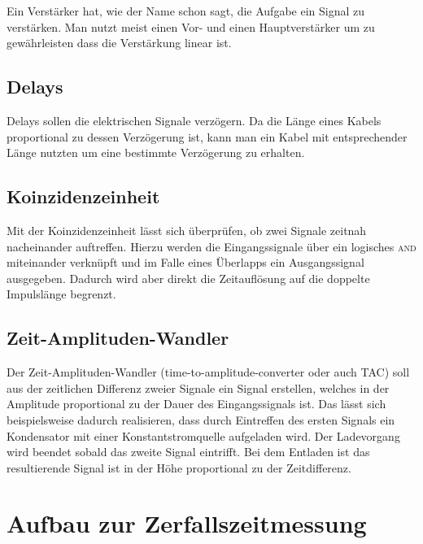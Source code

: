\documentclass[11pt, ngerman, fleqn, DIV=15, headinclude, BCOR=2cm]{scrreprt}
\begin{document}
Ein Verstärker hat, wie der Name schon sagt, die Aufgabe ein Signal zu
verstärken. Man nutzt meist einen Vor- und einen Hauptverstärker um zu
gewährleisten dass die Verstärkung linear ist. 

\subsection{Delays}

Delays sollen die elektrischen Signale verzögern. Da die Länge eines Kabels
proportional zu dessen Verzögerung ist, kann man ein Kabel mit entsprechender
Länge nutzten um eine bestimmte Verzögerung zu erhalten.

\subsection{Koinzidenzeinheit}

Mit der Koinzidenzeinheit lässt sich überprüfen, ob zwei Signale zeitnah
nacheinander auftreffen. Hierzu werden die Eingangssignale über ein logisches
\textsc{and} miteinander verknüpft und im Falle eines Überlapps ein Ausgangssignal
ausgegeben. Dadurch wird aber direkt die Zeitauflösung auf die doppelte
Impulslänge begrenzt.

\subsection{Zeit-Amplituden-Wandler}

Der Zeit-Amplituden-Wandler (time-to-amplitude-converter oder auch TAC) soll
aus der zeitlichen Differenz zweier Signale ein Signal erstellen, welches
in der Amplitude proportional zu der Dauer des Eingangssignals ist. Das lässt
sich beispielsweise dadurch realisieren, dass durch Eintreffen des ersten
Signals ein Kondensator mit einer Konstantstromquelle
aufgeladen wird. Der Ladevorgang wird beendet sobald das zweite Signal
eintrifft. Bei dem Entladen ist das resultierende Signal ist in der Höhe
proportional zu der Zeitdifferenz.

\section{Aufbau zur Zerfallszeitmessung}
\end{document}
